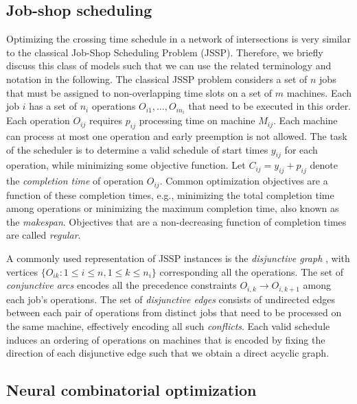 \documentclass[a4paper]{article}
\theoremstyle{definition}
\theoremstyle{plain}
\begin{document}
\subsection*{Job-shop scheduling}

Optimizing the crossing time schedule in a network of intersections is very
similar to the classical Job-Shop Scheduling Problem (JSSP). Therefore, we
briefly discuss this class of models such that we can use the related
terminology and notation in the following.
%
The classical JSSP problem considers a set of $n$ jobs that must be assigned to
non-overlapping time slots on a set of $m$ machines. Each job $i$ has a set of
$n_{i}$ operations $O_{i1}, \dots, O_{in_{i}}$ that need to be executed in this
order. Each operation $O_{ij}$ requires $p_{ij}$ processing time on machine
$M_{ij}$. Each machine can process at most one operation and early preemption is
not allowed. The task of the scheduler is to determine a valid schedule of start
times $y_{ij}$ for each operation, while minimizing some objective function. Let
$C_{ij} = y_{ij} + p_{ij}$ denote the \textit{completion time} of operation $O_{ij}$.
Common optimization objectives are a function of these completion times, e.g.,
minimizing the total completion time among operations or minimizing the maximum
completion time, also known as the \textit{makespan}. Objectives that are a
non-decreasing function of completion times are called \textit{regular}.

A commonly used representation of JSSP instances is the \textit{disjunctive
  graph} , with vertices $\{ O_{ik} : 1 \leq i \leq n, 1 \leq k \leq n_{i} \}$
corresponding all the operations. The set of \textit{conjunctive arcs} encodes
all the precedence constraints $O_{i,k} \rightarrow O_{i,k+1} $ among each job's
operations. The set of \textit{disjunctive edges} consists of undirected edges
between each pair of operations from distinct jobs that need to be processed on
the same machine, effectively encoding all such \textit{conflicts}. Each valid
schedule induces an ordering of operations on machines that is encoded by fixing
the direction of each disjunctive edge such that we obtain a direct acyclic
graph.

\subsection*{Neural combinatorial optimization}

\end{document}
